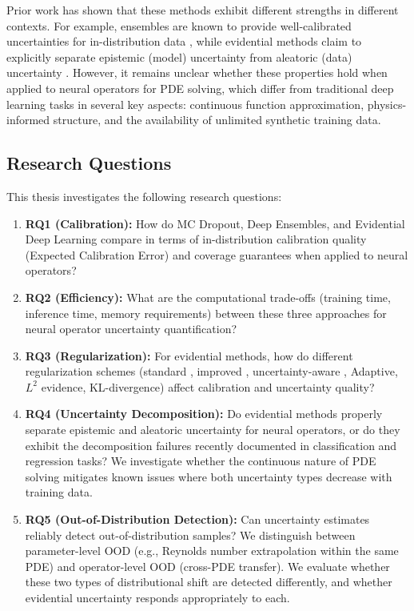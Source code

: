 Prior work has shown that these methods exhibit different strengths in different contexts. For example, ensembles are known to provide well-calibrated uncertainties for in-distribution data \cite{lakshminarayanan2017simple}, while evidential methods claim to explicitly separate epistemic (model) uncertainty from aleatoric (data) uncertainty \cite{amini2020deep}. However, it remains unclear whether these properties hold when applied to neural operators for PDE solving, which differ from traditional deep learning tasks in several key aspects: continuous function approximation, physics-informed structure, and the availability of unlimited synthetic training data.

\subsection{Research Questions}

This thesis investigates the following research questions:

\begin{enumerate}
    \item \textbf{RQ1 (Calibration):} How do MC Dropout, Deep Ensembles, and Evidential Deep Learning compare in terms of in-distribution calibration quality (Expected Calibration Error) and coverage guarantees when applied to neural operators?

    \item \textbf{RQ2 (Efficiency):} What are the computational trade-offs (training time, inference time, memory requirements) between these three approaches for neural operator uncertainty quantification?

    \item \textbf{RQ3 (Regularization):} For evidential methods, how do different regularization schemes (standard \cite{amini2020deep}, improved \cite{oh2022improving}, uncertainty-aware \cite{ye2024uncertainty}, Adaptive, $L^2$ evidence, KL-divergence) affect calibration and uncertainty quality?

    \item \textbf{RQ4 (Uncertainty Decomposition):} Do evidential methods properly separate epistemic and aleatoric uncertainty for neural operators, or do they exhibit the decomposition failures recently documented in classification and regression tasks? We investigate whether the continuous nature of PDE solving mitigates known issues where both uncertainty types decrease with training data.

    \item \textbf{RQ5 (Out-of-Distribution Detection):} Can uncertainty estimates reliably detect out-of-distribution samples? We distinguish between parameter-level OOD (e.g., Reynolds number extrapolation within the same PDE) and operator-level OOD (cross-PDE transfer). We evaluate whether these two types of distributional shift are detected differently, and whether evidential uncertainty responds appropriately to each.
\end{enumerate}

